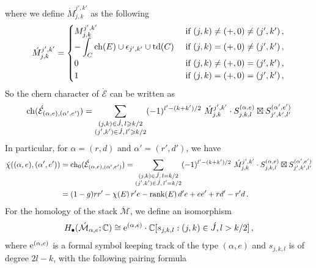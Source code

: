 \documentclass[11pt]{amsart}
\theoremstyle{remark}
\newcommand{\ch}{{\rm ch}}
\newcommand{\mb}[1]{\mathbb{#1}}
\newcommand{\mc}[1]{\mathcal{#1}}
\newcommand{\Mdash}{\acute{\mathcal{M}}}
\newcommand{\rk}{\textnormal{rank}}
\newcommand{\td}[0]{\textnormal{td}}
\newcommand{\ex}{\textnormal{e}}
\numberwithin{theorem}{section}
\begin{document}
where we define $\acute M_{j,k}^{j',k'}$ as the following
\begin{equation}
    \acute{M}_{j,k}^{j',k'} =
    \begin{cases}
    \displaystyle
        M_{j,k}^{j',k'} &
        \text{ if } (j, k) \neq ({+}, 0) \neq (j', k')\,, \\
        \displaystyle
        -\int_C \ch(E) \cup \epsilon_{j',k'} \cup \td(C) &
        \text{ if } (j, k) = ({+}, 0) \neq (j', k')\,, \\
        0 &
        \text{ if } (j, k) \neq ({+}, 0) = (j', k') \,, \\
        1 &
        \text{ if } (j, k) = ({+}, 0) = (j', k')\,,
    \end{cases}
\end{equation}
So the chern character of $\acute{\mc E}$ can be written as
\begin{equation*}
    \ch(\acute{\mc E}_{(\alpha,e), (\alpha',e')}) 
    = \sum_{\substack{(j,k) \in \acute J,\, l \geqslant k/2 \\ (j',k') \in \acute J,\, l' \geqslant k/2}} (-1)^{l'-(k+k')/2} \ \acute{M}_{j,k}^{j',k'} \cdot
     S^{(\alpha,e)}_{j,k,l} \boxtimes S^{(\alpha',e')}_{j',k',l'}
\end{equation*}
In particular, for $\alpha=(r,d)$ and $\alpha'=(r',d')$,
we have
\begin{align}\label{equation formula for chi}
    \nonumber
    \acute{\chi}((\alpha,e), (\alpha',e')) 
    & = \ch_0(\acute{\mc E}_{(\alpha,e), (\alpha',e')}) 
     = \sum_{\substack{(j,k) \in \acute J,\, l= k/2 \\ (j',k') \in \acute J,\, l' = k/2}} (-1)^{l'-(k+k')/2} \ \acute{M}_{j,k}^{j',k'} \cdot
     S^{(\alpha,e)}_{j,k,l} \boxtimes S^{(\alpha',e')}_{j',k',l'}\\
     & = (1-g)rr'-\chi(E)\,r'e -\rk(E)\, d'e+ee'+rd'-r'd\,.
\end{align}
For the homology of the stack $\Mdash$, we define an isomorphism
$$H_\bullet(\Mdash_{\alpha,e};\mb C) \cong \ex^{(\alpha,e)} \cdot \mb C[s_{j,k,l}: (j,k)\in \acute J, l>k/2]\,,$$
where $\ex^{(\alpha,e)}$ is a formal symbol keeping track of the type $(\alpha,e)$ and
$s_{j,k,l}$ is of degree $2l-k$, with the following pairing formula
\end{document}
